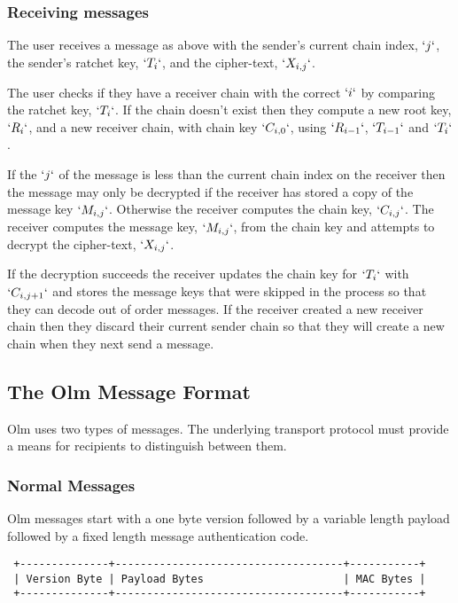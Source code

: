\documentclass[10pt]{article}
\begin{document}
\subsubsection{Receiving messages}\label{receiving-messages}

The user receives a message as above with the sender's current chain
index, \(`j`\), the sender's ratchet key, \(`T_i`\), and the
cipher-text, \(`X_{i,j}`\).

The user checks if they have a receiver chain with the correct \(`i`\)
by comparing the ratchet key, \(`T_i`\). If the chain doesn't exist then
they compute a new root key, \(`R_i`\), and a new receiver chain, with
chain key \(`C_{i,0}`\), using \(`R_{i-1}`\), \(`T_{i-1}`\) and
\(`T_i`\).

If the \(`j`\) of the message is less than the current chain index on
the receiver then the message may only be decrypted if the receiver has
stored a copy of the message key \(`M_{i,j}`\). Otherwise the receiver
computes the chain key, \(`C_{i,j}`\). The receiver computes the message
key, \(`M_{i,j}`\), from the chain key and attempts to decrypt the
cipher-text, \(`X_{i,j}`\).

If the decryption succeeds the receiver updates the chain key for
\(`T_i`\) with \(`C_{i,j+1}`\) and stores the message keys that were
skipped in the process so that they can decode out of order messages. If
the receiver created a new receiver chain then they discard their
current sender chain so that they will create a new chain when they next
send a message.

\subsection{The Olm Message Format}\label{the-olm-message-format}

Olm uses two types of messages. The underlying transport protocol must
provide a means for recipients to distinguish between them.

\subsubsection{Normal Messages}\label{normal-messages}

Olm messages start with a one byte version followed by a variable length
payload followed by a fixed length message authentication code.

\begin{verbatim}
 +--------------+------------------------------------+-----------+
 | Version Byte | Payload Bytes                      | MAC Bytes |
 +--------------+------------------------------------+-----------+
\end{verbatim}
\end{document}
